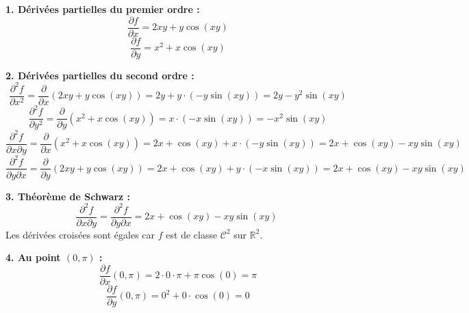 \documentclass[12pt,a4paper]{article}
\begin{document}
\begin{boitecorrige}
\textbf{1. Dérivées partielles du premier ordre :}
\[
\frac{\partial f}{\partial x} = 2xy + y\cos(xy)
\]
\[
\frac{\partial f}{\partial y} = x^2 + x\cos(xy)
\]

\textbf{2. Dérivées partielles du second ordre :}
\[
\frac{\partial^2 f}{\partial x^2} = \frac{\partial}{\partial x}(2xy + y\cos(xy)) = 2y + y\cdot(-y\sin(xy)) = 2y - y^2\sin(xy)
\]
\[
\frac{\partial^2 f}{\partial y^2} = \frac{\partial}{\partial y}(x^2 + x\cos(xy)) = x\cdot(-x\sin(xy)) = -x^2\sin(xy)
\]
\[
\frac{\partial^2 f}{\partial x\partial y} = \frac{\partial}{\partial x}(x^2 + x\cos(xy)) = 2x + \cos(xy) + x\cdot(-y\sin(xy)) = 2x + \cos(xy) - xy\sin(xy)
\]
\[
\frac{\partial^2 f}{\partial y\partial x} = \frac{\partial}{\partial y}(2xy + y\cos(xy)) = 2x + \cos(xy) + y\cdot(-x\sin(xy)) = 2x + \cos(xy) - xy\sin(xy)
\]

\textbf{3. Théorème de Schwarz :}
\[
\frac{\partial^2 f}{\partial x\partial y} = \frac{\partial^2 f}{\partial y\partial x} = 2x + \cos(xy) - xy\sin(xy) \;
\]
Les dérivées croisées sont égales car $f$ est de classe $\mathcal{C}^2$ sur $\mathbb{R}^2$.

\textbf{4. Au point $(0, \pi)$ :}
\[
\frac{\partial f}{\partial x}(0,\pi) = 2\cdot0\cdot\pi + \pi\cos(0) = \pi
\]
\[
\frac{\partial f}{\partial y}(0,\pi) = 0^2 + 0\cdot\cos(0) = 0
\]
\end{boitecorrige}

\ifdefined\inMainDoc\else
\end{document}

